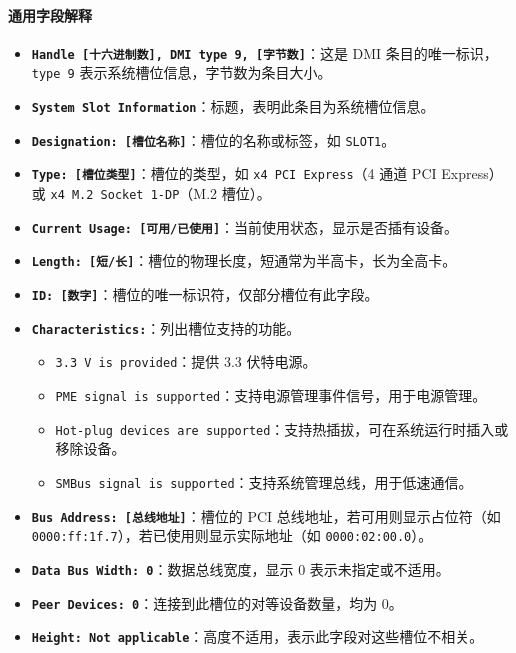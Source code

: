\paragraph{通用字段解释}
\begin{itemize}
    \item \textbf{\texttt{Handle [十六进制数], DMI type 9, [字节数]}}：这是 DMI 条目的唯一标识，\texttt{type 9} 表示系统槽位信息，字节数为条目大小。
    \item \textbf{\texttt{System Slot Information}}：标题，表明此条目为系统槽位信息。
    \item \textbf{\texttt{Designation: [槽位名称]}}：槽位的名称或标签，如 \texttt{SLOT1}。
    \item \textbf{\texttt{Type: [槽位类型]}}：槽位的类型，如 \texttt{x4 PCI Express}（4 通道 PCI Express）或 \texttt{x4 M.2 Socket 1-DP}（M.2 槽位）。
    \item \textbf{\texttt{Current Usage: [可用/已使用]}}：当前使用状态，显示是否插有设备。
    \item \textbf{\texttt{Length: [短/长]}}：槽位的物理长度，短通常为半高卡，长为全高卡。
    \item \textbf{\texttt{ID: [数字]}}：槽位的唯一标识符，仅部分槽位有此字段。
    \item \textbf{\texttt{Characteristics:}}：列出槽位支持的功能。
    \begin{itemize}
        \item \texttt{3.3 V is provided}：提供 3.3 伏特电源。
        \item \texttt{PME signal is supported}：支持电源管理事件信号，用于电源管理。
        \item \texttt{Hot-plug devices are supported}：支持热插拔，可在系统运行时插入或移除设备。
        \item \texttt{SMBus signal is supported}：支持系统管理总线，用于低速通信。
    \end{itemize}
    \item \textbf{\texttt{Bus Address: [总线地址]}}：槽位的 PCI 总线地址，若可用则显示占位符（如 \texttt{0000:ff:1f.7}），若已使用则显示实际地址（如 \texttt{0000:02:00.0}）。
    \item \textbf{\texttt{Data Bus Width: 0}}：数据总线宽度，显示 0 表示未指定或不适用。
    \item \textbf{\texttt{Peer Devices: 0}}：连接到此槽位的对等设备数量，均为 0。
    \item \textbf{\texttt{Height: Not applicable}}：高度不适用，表示此字段对这些槽位不相关。
\end{itemize}

